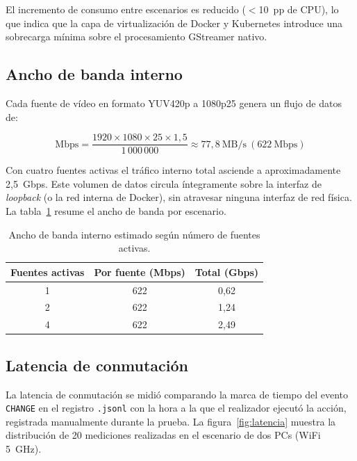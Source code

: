 El incremento de consumo entre escenarios es reducido ($<$10~pp de CPU), lo que
indica que la capa de virtualización de Docker y Kubernetes introduce una sobrecarga
mínima sobre el procesamiento GStreamer nativo.

\subsection{Ancho de banda interno}

Cada fuente de vídeo en formato YUV420p a 1080p25 genera un flujo de datos de:

\[
  \text{Mbps} = \frac{1920 \times 1080 \times 25 \times 1{,}5}{1\,000\,000}
             \approx 77{,}8\ \text{MB/s}\ (622\ \text{Mbps})
\]

Con cuatro fuentes activas el tráfico interno total asciende a aproximadamente
2{,}5~Gbps. Este volumen de datos circula íntegramente sobre la interfaz de
\textit{loopback} (o la red interna de Docker), sin atravesar ninguna interfaz de
red física. La tabla~\ref{tab:bandwidth} resume el ancho de banda por escenario.

\begin{table}[H]
  \centering
  \caption{Ancho de banda interno estimado según número de fuentes activas.}
  \label{tab:bandwidth}
  \begin{tabular}{|c|c|c|}
    \hline
    \textbf{Fuentes activas} & \textbf{Por fuente (Mbps)} & \textbf{Total (Gbps)} \\
    \hline
    1 & 622 & 0{,}62 \\
    2 & 622 & 1{,}24 \\
    4 & 622 & 2{,}49 \\
    \hline
  \end{tabular}
\end{table}

\subsection{Latencia de conmutación}

La latencia de conmutación se midió comparando la marca de tiempo del evento
\texttt{CHANGE} en el registro \texttt{.jsonl} con la hora a la que el realizador
ejecutó la acción, registrada manualmente durante la prueba. La
figura~\ref{fig:latencia} muestra la distribución de 20 mediciones realizadas en
el escenario de dos PCs (WiFi 5~GHz).

